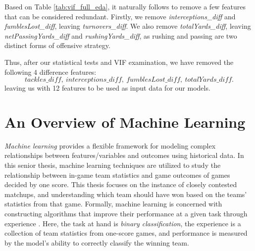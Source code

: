 \documentclass[11pt]{amsart}
\theoremstyle{definition}                  %
\theoremstyle{remark}                       %
\numberwithin{equation}{section}
\begin{document}
Based on Table \ref{tab:vif_full_eda}, it naturally follows to remove a few features that can be considered redundant. Firstly, we remove \textit{interceptions\_diff} and \textit{fumblesLost\_diff}, leaving \textit{turnovers\_diff}. We also remove \textit{totalYards\_diff}, leaving \textit{netPassingYards\_diff} and \textit{rushingYards\_diff}, as rushing and passing are two distinct forms of offensive strategy.

Thus, after our statistical tests and VIF examination, we have removed the following 4 difference features:
\[
\textit{tackles\_diff},\ \textit{interceptions\_diff},\ \textit{fumblesLost\_diff},\ \textit{totalYards\_diff}.
\]
leaving us with 12 features to be used as input data for our models.

\section{An Overview of Machine Learning}
\textit{Machine learning} provides a flexible framework for modeling complex relationships between features/variables and outcomes using historical data. In this senior thesis, machine learning techniques are utilized to study the relationship between in-game team statistics and game outcomes of games decided by one score. This thesis focuses on the instance of closely contested matchups, and understanding which team should have won based on the teams' statistics from that game. Formally, machine learning is concerned with constructing algorithms that improve their performance at a given task through experience \cite{mitchell1997machine}. Here, the task at hand is \textit{binary classification}, the experience is a collection of team statistics from one-score games, and performance is measured by the model’s ability to correctly classify the winning team.
\end{document}
